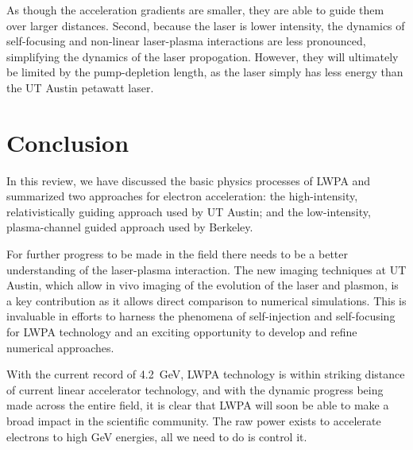 \documentclass[12pt,letter]{article}
\begin{document}
As though the acceleration gradients are smaller, they are able to guide them
over larger distances. Second, because the laser is lower intensity, the dynamics
of self-focusing and non-linear laser-plasma interactions are less
pronounced, simplifying the dynamics of the laser propogation. However,
they will ultimately be limited by the pump-depletion length, as the laser
simply has less energy than the UT Austin petawatt laser.

\section{Conclusion}
In this review, we have discussed the basic physics processes of LWPA and
summarized two approaches for electron acceleration:
the high-intensity, relativistically guiding approach used by UT Austin; and the
low-intensity, plasma-channel guided approach used by Berkeley.

For further
progress to be made in the field there needs to be a better understanding of
the laser-plasma interaction. The new imaging
techniques at UT Austin, which allow in vivo imaging of the evolution
of the laser and plasmon, is a key contribution as it allows direct comparison to numerical
simulations. This is invaluable in efforts to harness the phenomena of
self-injection and self-focusing for LWPA technology and an exciting
opportunity to develop and refine numerical approaches. 

With the current record of \SI{4.2}{\giga\electronvolt}, LWPA
technology is within striking distance of current linear accelerator technology,
and with the dynamic progress being made across the entire field, it is clear
that LWPA will soon be able to make a broad impact in the scientific
community. The raw power exists to accelerate
electrons to high GeV energies, all we need to do is control it.

\end{document}
